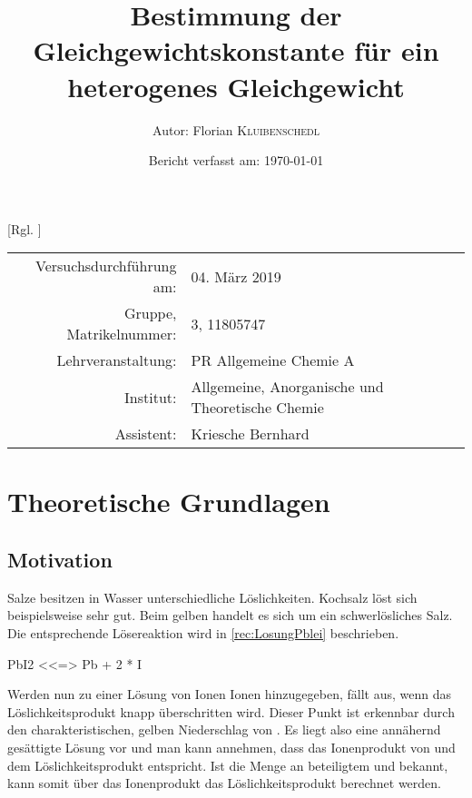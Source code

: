 \documentclass{article}
\title{Bestimmung der Gleichgewichtskonstante für ein heterogenes Gleichgewicht \cite{Versuchsvorschrift}} %
\author{Autor: Florian \textsc{Kluibenschedl}} %
\date{Bericht verfasst am: \today} %
\begin{document}
  [Rgl. ]{}{}
  
  \maketitle %
  
  \begin{center}
    \begin{tabular}{r p{4cm}}
      Versuchsdurchführung am: & 04. März 2019\\ %
      Gruppe, Matrikelnummer: & 3, 11805747 \\
      Lehrveranstaltung: & PR Allgemeine Chemie A \\
      Institut: & Allgemeine, Anorganische und Theoretische Chemie \\
      Assistent: & Kriesche Bernhard %
    \end{tabular}
  \end{center}


  \begin{abstract}
    
  \end{abstract}
  
  \pagebreak
  
  \section{Theoretische Grundlagen}
  
    \subsection{Motivation} \label{sec:Motivation}
    
      Salze besitzen in Wasser unterschiedliche Löslichkeiten. Kochsalz  löst sich beispielsweise sehr gut. Beim gelben  handelt es sich um ein schwerlösliches Salz. Die entsprechende Lösereaktion wird in \ref{rec:LosungPblei} beschrieben. 
           
      \begin{reaction}
        PbI2\sld{} <<=> Pb\pch[2]\aq{} +  2 * I\mch\aq{} \label{rec:LosungPblei}
      \end{reaction}
      
      Werden nun zu einer Lösung von  Ionen  Ionen hinzugegeben, fällt  aus, wenn das Löslichkeitsprodukt knapp überschritten wird. Dieser Punkt ist erkennbar durch den charakteristischen, gelben Niederschlag von . Es liegt also eine annähernd gesättigte Lösung vor und man kann annehmen, dass das Ionenprodukt von  und  dem Löslichkeitsprodukt entspricht. Ist die Menge an beteiligtem  und  bekannt, kann somit über das Ionenprodukt das Löslichkeitsprodukt berechnet werden.
      
\end{document}
